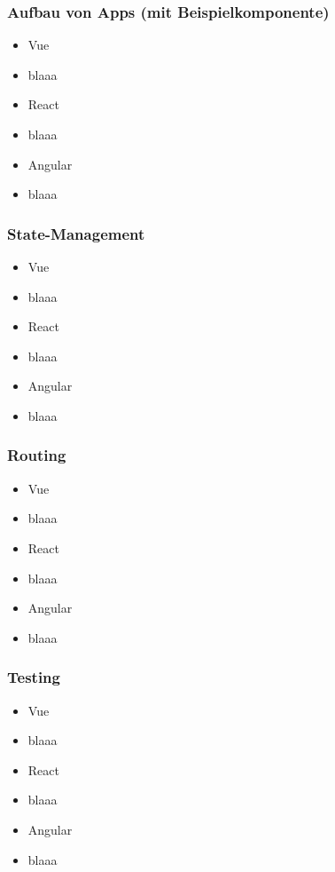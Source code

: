 \subsubsection{Aufbau von Apps (mit Beispielkomponente)}
\begin{itemize}
    \item{Vue}
    \item[] blaaa
    \item{React}
    \item[] blaaa
    \item{Angular}
    \item[] blaaa 
\end{itemize}

\subsubsection{State-Management}
\begin{itemize}
    \item{Vue}
    \item[] blaaa
    \item{React}
    \item[] blaaa
    \item{Angular}
    \item[] blaaa 
\end{itemize}

\subsubsection{Routing}
\begin{itemize}
    \item{Vue}
    \item[] blaaa
    \item{React}
    \item[] blaaa
    \item{Angular}
    \item[] blaaa 
\end{itemize}

\subsubsection{Testing}
\begin{itemize}
    \item{Vue}
    \item[] blaaa
    \item{React}
    \item[] blaaa
    \item{Angular}
    \item[] blaaa 
\end{itemize}

